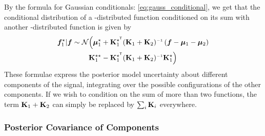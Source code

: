 By the formula for Gaussian conditionals: \cref{eq:gauss_conditional}, we get that the conditional distribution of a \gp{}-distributed function conditioned on its sum with another \gp{}-distributed function is given by
%
\begin{align}
\vf_1^\star | \vf \sim \Normal \Big( 
\vmu_1^\star + \vK_1^{\star\tra} & (\vK_1 + \vK_2)\inv \left( \vf - \vmu_1 - \vmu_2 \right) \nonumber \\
\vK_1^{\star\star} - \vK_1^{\star\tra} & (\vK_1 + \vK_2)\inv \vK_1^{\star} \Big)
\end{align}
%
These formulae express the posterior model uncertainty about different components of the signal, integrating over the possible configurations of the other components.
If we wish to condition on the sum of more than two functions, the term $\mathbf{K}_1 + \mathbf{K}_2$ can simply be replaced by $\sum_i \mathbf{K}_i$ everywhere.




\subsubsection{Posterior Covariance of Components}

